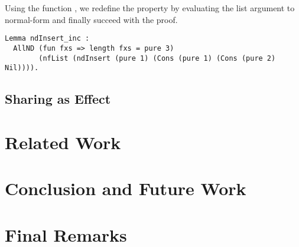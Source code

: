 Using the function , we redefine the property by
evaluating the list argument to normal-form and finally succeed with
the proof.

\begin{verbatim}
Lemma ndInsert_inc :
  AllND (fun fxs => length fxs = pure 3)
        (nfList (ndInsert (pure 1) (Cons (pure 1) (Cons (pure 2) Nil)))).
\end{verbatim}

\subsection{Sharing as Effect}

\section{Related Work}
\section{Conclusion and Future Work}

\section{Final Remarks}
